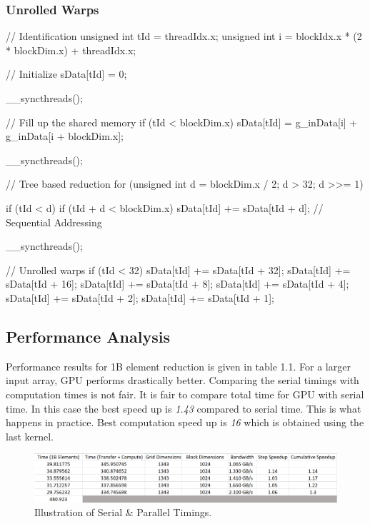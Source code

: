\documentclass[12pt]{article}
\numberwithin{equation}{section}
\numberwithin{table}{section}
\numberwithin{figure}{section}
\begin{document}
\subsubsection*{Unrolled Warps}
\begin{cpp}
	// Identification
	unsigned int tId = threadIdx.x;
	unsigned int i = blockIdx.x * (2 * blockDim.x) + threadIdx.x;
	
	// Initialize
	sData[tId] = 0;
	
	__syncthreads();
	
	// Fill up the shared memory
	if (tId < blockDim.x) {
		sData[tId] = g_inData[i] + g_inData[i + blockDim.x];
	}
	
	__syncthreads();
	
	// Tree based reduction
	for (unsigned int d = blockDim.x / 2; d > 32; d >>= 1) {
		if (tId < d)
			if (tId + d < blockDim.x)
				sData[tId] += sData[tId + d];		// Sequential Addressing
		
		__syncthreads();
	}
	
	// Unrolled warps
	if (tId < 32) {
		sData[tId] += sData[tId + 32];
		sData[tId] += sData[tId + 16];
		sData[tId] += sData[tId + 8];
		sData[tId] += sData[tId + 4];
		sData[tId] += sData[tId + 2];
		sData[tId] += sData[tId + 1];
	}
\end{cpp}

\subsection*{Performance Analysis}
Performance results for 1B element reduction is given in table 1.1. For a larger input array, GPU performs drastically better. Comparing the serial timings with computation times is not fair. It is fair to compare total time for GPU with serial time. In this case the best speed up is \textit{1.43} compared to serial time. This is what happens in practice. Best computation speed up is \textit{16} which is obtained using the last kernel.
\begin{figure}[!h]\centering
	\includegraphics[width=1\textwidth]{speeds.png}
	\caption{Illustration of Serial \& Parallel Timings.}
	\label{pl1}
\end{figure}
\end{document}
